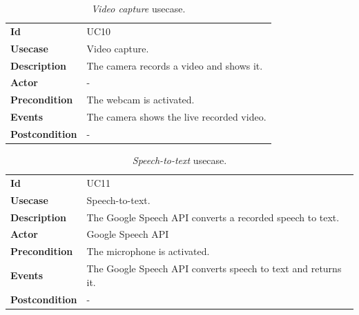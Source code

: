 \begin{table}[h!t]
    \centering
    \caption{\emph{Video capture} usecase.}
    \label{tab:uc:video}
    \centering
    \begin{tabular}{l | p{80mm}}
        \textbf{Id}            & UC10                                      \\
        \textbf{Usecase}       & Video capture.                            \\
        \textbf{Description}   & The camera records a video and shows it.  \\
        \textbf{Actor}         & -                                         \\
        \textbf{Precondition}  & The webcam is activated.                  \\
        \textbf{Events}        & The camera shows the live recorded video. \\
        \textbf{Postcondition} & -
    \end{tabular}
\end{table}

\begin{table}[h!t]
    \centering
    \caption{\emph{Speech-to-text} usecase.}
    \label{tab:uc:speech}
    \centering
    \begin{tabular}{l | p{80mm}}
        \textbf{Id}            & UC11                                                          \\
        \textbf{Usecase}       & Speech-to-text.                                               \\
        \textbf{Description}   & The Google Speech API converts a recorded speech to text.     \\
        \textbf{Actor}         & Google Speech API                                             \\
        \textbf{Precondition}  & The microphone is activated.                                  \\
        \textbf{Events}        & The Google Speech API converts speech to text and returns it. \\
        \textbf{Postcondition} & -
    \end{tabular}
\end{table}


